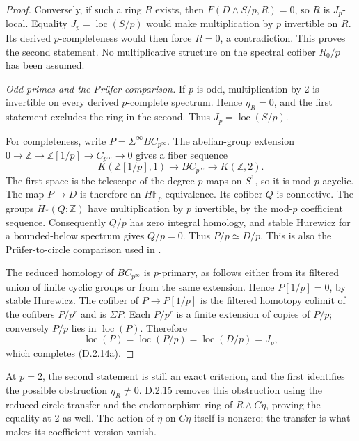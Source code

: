 \begin{proof}
Conversely, if such a ring $R$ exists, then
$F(D\wedge S/p,R)=0$, so $R$ is $J_p$-local.
Equality $J_p=\operatorname{loc}(S/p)$ would make multiplication
by $p$ invertible on $R$. Its derived $p$-completeness would then
force $R=0$, a contradiction. This proves the second statement.
No multiplicative structure on the spectral cofiber $R_0/p$ has
been assumed.

\emph{Odd primes and the Pr\"ufer comparison.}
If $p$ is odd, multiplication by $2$ is invertible on every derived
$p$-complete spectrum. Hence $\eta_R=0$, and the first statement
excludes the ring in the second. Thus $J_p=\operatorname{loc}(S/p)$.

For completeness, write $P=\Sigma^\infty BC_{p^\infty}$.
The abelian-group extension
$0\to\mathbb Z\to\mathbb Z[1/p]\to C_{p^\infty}\to0$
gives a fiber sequence
\[
 K(\mathbb Z[1/p],1)\longrightarrow BC_{p^\infty}
       \longrightarrow K(\mathbb Z,2).
\]
The first space is the telescope of the degree-$p$ maps on $S^1$,
so it is mod-$p$ acyclic. The map $P\to D$ is therefore an
$H\mathbb F_p$-equivalence. Its cofiber $Q$ is connective.
The groups $H_*(Q;\mathbb Z)$ have multiplication by $p$ invertible,
by the mod-$p$ coefficient sequence. Consequently $Q/p$ has zero
integral homology, and stable Hurewicz for a bounded-below spectrum
gives $Q/p=0$. Thus $P/p\simeq D/p$.
This is also the Pr\"ufer-to-circle comparison used in
\cite[proof of Theorem 1.5]{EH5Levy2025}.

The reduced homology of $BC_{p^\infty}$ is $p$-primary, as follows
either from its filtered union of finite cyclic groups or from the
same extension. Hence $P[1/p]=0$, by stable Hurewicz.
The cofiber of $P\to P[1/p]$ is the filtered homotopy colimit of
the cofibers $P/p^r$ and is $\Sigma P$.
Each $P/p^r$ is a finite extension of copies of $P/p$; conversely
$P/p$ lies in $\operatorname{loc}(P)$.
Therefore
\[
 \operatorname{loc}(P)=\operatorname{loc}(P/p)
     =\operatorname{loc}(D/p)=J_p,
\]
which completes \textup{(D.2.14a)}.
\end{proof}

At $p=2$, the second statement is still an exact criterion, and
the first identifies the possible obstruction $\eta_R\ne0$.
D.2.15 removes this obstruction using the reduced circle transfer
and the endomorphism ring of $R\wedge C\eta$, proving the equality
at $2$ as well. The action of $\eta$ on $C\eta$ itself is nonzero;
the transfer is what makes its coefficient version vanish.

